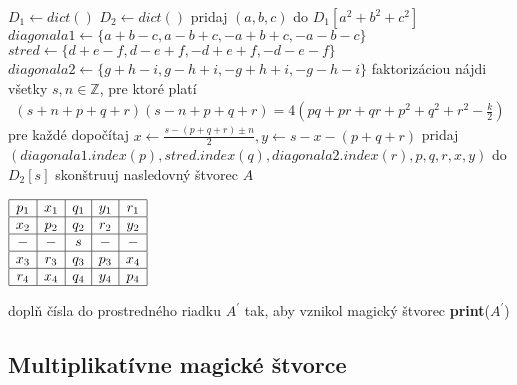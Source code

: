 \begin{algorithmic}
\STATE $D_1 \gets dict()$
\STATE $D_2 \gets dict()$
    \STATE pridaj $(a,b,c)$ do $D_1[a^2 + b^2 + c^2]$
\ENDFOR
{}
	  \STATE $diagonala1 \gets \{a+b-c, a-b+c, -a+b+c, -a-b-c\}$
	  \STATE $stred \gets \{d+e-f, d-e+f, -d+e+f, -d-e-f\}$
	  \STATE $diagonala2 \gets \{g+h-i,g-h+i,-g+h+i,-g-h-i\}$
		\STATE faktorizáciou nájdi všetky $s,n \in \mathbb{Z}$, pre ktoré platí
				\begin{gather*}
				(s+n+p+q+r)(s-n+p+q+r) = 4(pq + pr + qr + p^2 + q^2 + r^2 - \frac{k}{2})
				\end{gather*}
		\STATE pre každé dopočítaj $x \gets \frac{s - (p+q+r) \pm n}{2}, y \gets s - x - (p+q+r)$
			\STATE pridaj $(diagonala1.index(p),stred.index(q),diagonala2.index(r), p, q, r, x, y)$ do $D_2[s]$
		\ENDIF
	  \ENDFOR
    \ENDFOR
\ENDFOR
{}
		\STATE skonštruuj nasledovný štvorec $A$
		\begin{center}
		$\begin{array}{ |c|c|c|c|c| }
		\hline
		p_1 & x_1 & q_1 & y_1 & r_1 \\ 
		\hline
		x_2 & p_2 & q_2 & r_2 & y_2  \\ 
		\hline
		- & - & s & - & - \\ 
		\hline
		x_3 & r_3 & q_3 & p_3 & x_4 \\ 
		\hline
		r_4 & x_4 & q_4 & y_4 & p_4 \\
		\hline
		\end{array}$
		\end{center}

			\STATE doplň čísla do prostredného riadku $A^\prime$ tak, aby vznikol magický štvorec
				\STATE \textbf{print}($A^\prime$)
			\ENDIF
		\ENDFOR
	  \ENDIF
    \ENDFOR
\ENDFOR
\end{algorithmic}

\subsection{Multiplikatívne magické štvorce} 

